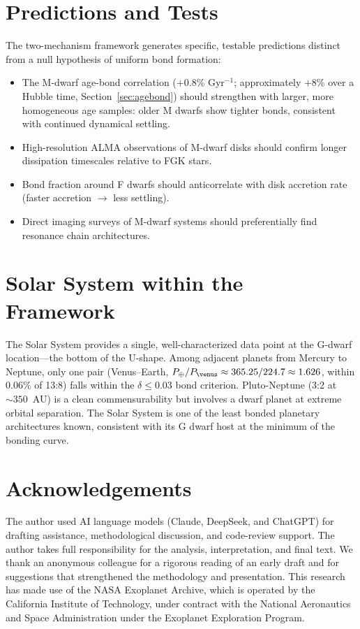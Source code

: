 \documentclass[twocolumn,usenatbib]{mnras}
\begin{document}
\section{Predictions and Tests}

The two-mechanism framework generates specific, testable predictions distinct
from a null hypothesis of uniform bond formation:
\begin{itemize}
  \item The M-dwarf age-bond correlation ($+0.8\%$ Gyr$^{-1}$; approximately
        $+8\%$ over a Hubble time,
        Section~\ref{sec:agebond}) should strengthen with larger, more
        homogeneous age samples: older M dwarfs show tighter bonds, consistent
        with continued dynamical settling.
  \item High-resolution ALMA observations of M-dwarf disks should confirm
        longer dissipation timescales relative to FGK stars.
  \item Bond fraction around F dwarfs should anticorrelate with disk accretion
        rate (faster accretion $\rightarrow$ less settling).
  \item Direct imaging surveys of M-dwarf systems should preferentially find
        resonance chain architectures.
\end{itemize}

\section{Solar System within the Framework}

The Solar System provides a single, well-characterized data point at the
G-dwarf location---the bottom of the U-shape. Among adjacent planets from
Mercury to Neptune, only one pair (Venus--Earth, $P_\oplus/P_\venus \approx
365.25/224.7 \approx 1.626$, within 0.06\% of 13:8) falls
within the $\delta \leq 0.03$ bond criterion. Pluto-Neptune (3:2 at $\sim
350$~AU) is a clean commensurability but involves a dwarf planet at extreme
orbital separation. The Solar System is one of the least bonded planetary
architectures known, consistent with its G dwarf host at the minimum of the
bonding curve.

\section{Acknowledgements}

The author used AI language models (Claude, DeepSeek, and ChatGPT) for
drafting assistance, methodological discussion, and code-review support.
The author takes full responsibility for the analysis, interpretation, and
final text. We thank an anonymous colleague for a rigorous reading of an early
draft and for suggestions that strengthened the methodology and presentation.
This research has made use of the NASA Exoplanet Archive, which is operated by
the California Institute of Technology, under contract with the National
Aeronautics and Space Administration under the Exoplanet Exploration Program.
\end{document}
